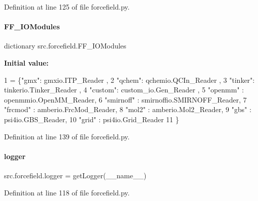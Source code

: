 Definition at line 125 of file forcefield.\+py.

\mbox{\label{namespacesrc_1_1forcefield_a629afe3f91d5e48026b8bab018aefe30}} 
\paragraph{\texorpdfstring{F\+F\+\_\+\+I\+O\+Modules}{FF\_IOModules}}
{\footnotesize\ttfamily dictionary src.\+forcefield.\+F\+F\+\_\+\+I\+O\+Modules}

{\bfseries Initial value\+:}
\begin{DoxyCode}
1 =  \{\textcolor{stringliteral}{"gmx"}: gmxio.ITP\_Reader ,
2                 \textcolor{stringliteral}{"qchem"}: qchemio.QCIn\_Reader ,
3                 \textcolor{stringliteral}{"tinker"}: tinkerio.Tinker\_Reader ,
4                 \textcolor{stringliteral}{"custom"}: custom\_io.Gen\_Reader ,
5                 \textcolor{stringliteral}{"openmm"} : openmmio.OpenMM\_Reader,
6                 \textcolor{stringliteral}{"smirnoff"} : smirnoffio.SMIRNOFF\_Reader,
7                 \textcolor{stringliteral}{"frcmod"} : amberio.FrcMod\_Reader,
8                 \textcolor{stringliteral}{"mol2"} : amberio.Mol2\_Reader,
9                 \textcolor{stringliteral}{"gbs"} : psi4io.GBS\_Reader,
10                 \textcolor{stringliteral}{"grid"} : psi4io.Grid\_Reader
11                 \}
\end{DoxyCode}


Definition at line 139 of file forcefield.\+py.

\mbox{\label{namespacesrc_1_1forcefield_a75e3cd97344b3c003c73bf0540e85fa0}} 
\paragraph{\texorpdfstring{logger}{logger}}
{\footnotesize\ttfamily src.\+forcefield.\+logger = get\+Logger(\+\_\+\+\_\+name\+\_\+\+\_\+)}



Definition at line 118 of file forcefield.\+py.

